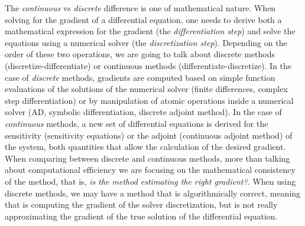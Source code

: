 The \textit{continuous} vs \textit{discrete} difference is one of mathematical nature. 
When solving for the gradient of a differential equation, one needs to derive both a mathematical expression for the gradient (the \textit{differentiation step}) and solve the equations using a numerical solver (the \textit{discretization step})\cite{bradley2013pde, Onken_Ruthotto_2020, FATODE2014, Sirkes_Tziperman_1997}. 
Depending on the order of these two operations, we are going to talk about discrete methods (discretize-differentiate) or continuous methods (differentiate-discretize). 
In the case of \textit{discrete} methods, gradients are computed based on simple function evaluations of the solutions of the numerical solver (finite differences, complex step differentiation) or by manipulation of atomic operations inside a numerical solver (AD, symbolic differentiation, discrete adjoint method). 
In the case of \textit{continuous} methods, a new set of differential equations is derived for the sensitivity (sensitivity equations) or the adjoint (continuous adjoint method) of the system, both quantities that allow the calculation of the desired gradient.   
When comparing between discrete and continuous methods, more than talking about computational efficiency we are focusing on the mathematical consistency of the method, that is, \textit{is the method estimating the right gradient?}. 
When using discrete methods, we may have a method that is algorithmically correct, meaning that is computing the gradient of the solver discretization, but is not really approximating the gradient of the true solution of the differential equation. 

